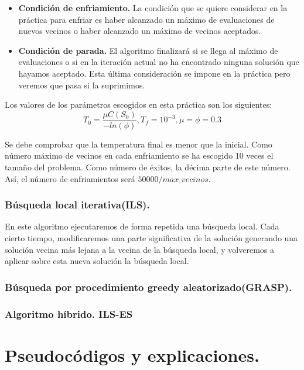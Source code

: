 \begin{itemize}
	 \item \textbf{Condición de enfriamiento.} La condición que se quiere considerar en la práctica para enfriar es haber alcanzado un máximo de evaluaciones de nuevos vecinos o haber alcanzado un máximo de vecinos aceptados.
	 
	 \item \textbf{Condición de parada.} El algoritmo finalizará si se llega al máximo de evaluaciones o si en la iteración actual no ha encontrado ninguna solución que hayamos aceptado. Esta última consideración se impone en la práctica pero veremos que pasa si la suprimimos.
	
	
\end{itemize}

Los valores de los parámetros escogidos en esta práctica son los siguientes:\\

\[T_0=\dfrac{\mu C(S_0)}{-ln(\phi)},T_f=10^{-3},\mu=\phi=0.3\]

Se debe comprobar que la temperatura final es menor que la inicial. Como número máximo de vecinos en cada enfriamiento se ha escogido 10 veces el tamaño del problema. Como número de éxitos, la décima parte de este número. Así, el número de enfriamientos será $50000/max\_vecinos$.



\subsubsection{Búsqueda local iterativa(ILS).}

En este algoritmo ejecutaremos de forma repetida una búsqueda local. Cada cierto tiempo, modificaremos una parte significativa de la solución generando una solución vecina más lejana a la vecina de la búsqueda local, y volveremos a aplicar sobre esta nueva solución la búsqueda local. 

\subsubsection{Búsqueda por procedimiento greedy aleatorizado(GRASP).}


\subsubsection{Algoritmo híbrido. ILS-ES}

\newpage
\section{Pseudocódigos y explicaciones.}

